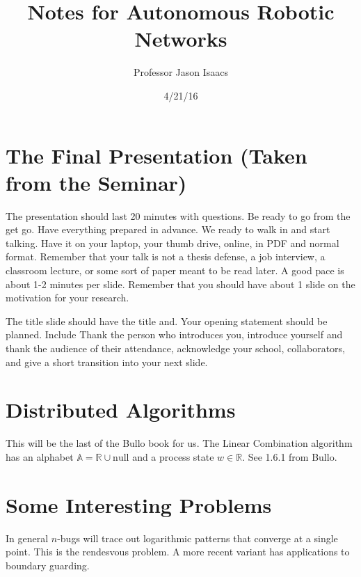 \documentclass{article}
\title{Notes for Autonomous Robotic Networks}
\author{Professor Jason Isaacs}
\date{4/21/16}
\begin{document}
\maketitle
\section{The Final Presentation (Taken from the Seminar)}
The presentation should last 20 minutes with questions. Be ready to go from the
get go. Have everything prepared in advance. We ready to walk in and start
talking. Have it on your laptop, your thumb drive, online, in PDF and normal
format. Remember that your talk is not a thesis defense, a job interview, a
classroom lecture, or some sort of paper meant to be read later. A good pace is
about 1-2 minutes per slide. Remember that you should have about 1 slide on the
motivation for your research. 

The title slide should have the title and. Your opening statement should be
planned. Include Thank the person who introduces you, introduce yourself and
thank the audience of their attendance, acknowledge your school, collaborators,
and give a short transition into your next slide. 

\section{Distributed Algorithms}
This will be the last of the Bullo book for us. The Linear Combination algorithm
has an alphabet $\mathbb{A} = \mathbb{R} \cup \text{null}$ and a process state
$w \in \mathbb{R}$. See 1.6.1 from Bullo. 

\section{Some Interesting Problems}
In general $n$-bugs will trace out logarithmic patterns that converge at a
single point. This is the rendesvous problem. A more recent variant has
applications to boundary guarding. 
\end{document}
